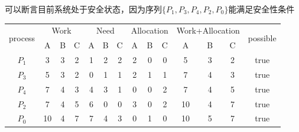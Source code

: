 \documentclass[cs4size,a4paper,10pt]{ctexart}
\begin{document}
	可以断言目前系统处于安全状态，因为序列$\{P_1,P_3,P_4,P_2,P_0\}$能满足安全性条件
	\begin{table}[H]
	\centering
	\begin{tabular}{c|ccc|ccc|ccc|ccc|c}
	\hline
	\multirow{2}{*}{process} & \multicolumn{3}{c|}{Work} & \multicolumn{3}{c|}{Need} & \multicolumn{3}{c|}{Allocation} & \multicolumn{3}{c|}{Work+Allocation} & \multirow{2}{*}{possible} \\ \cline{2-13}
							 & A       & B      & C      & A       & B      & C      & A         & B        & C        & A           & B          & C         &                           \\ \hline
	$P_1$                    & 3       & 3      & 2      & 1       & 2      & 2      & 2         & 0        & 0        & 5           & 3          & 2         & true                      \\ \hline
	$P_3$                    & 5       & 3      & 2      & 0       & 1      & 1      & 2         & 1        & 1        & 7           & 4          & 3         & true                      \\ \hline
	$P_4$                    & 7       & 4      & 3      & 4       & 3      & 1      & 0         & 0        & 2        & 7           & 4          & 5         & true                      \\ \hline
	$P_2$                    & 7       & 4      & 5      & 6       & 0      & 0      & 3         & 0        & 2        & 10          & 4          & 7         & true                      \\ \hline
	$P_0$                    & 10      & 4      & 7      & 7       & 4      & 3      & 0         & 1        & 0        & 10          & 5          & 7         & true                      \\ \hline
	\end{tabular}
	\end{table}
\end{document}
